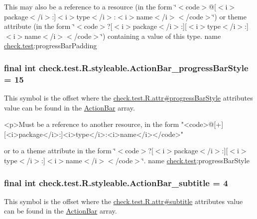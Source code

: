 This may also be a reference to a resource (in the form \char`\"{}$<$code$>$@\mbox{[}$<$i$>$package$<$/i$>$\+:\mbox{]}$<$i$>$type$<$/i$>$\+:$<$i$>$name$<$/i$>$$<$/code$>$\char`\"{}) or theme attribute (in the form \char`\"{}$<$code$>$?\mbox{[}$<$i$>$package$<$/i$>$\+:\mbox{]}\mbox{[}$<$i$>$type$<$/i$>$\+:\mbox{]}$<$i$>$name$<$/i$>$$<$/code$>$\char`\"{}) containing a value of this type.  name \hyperlink{namespacecheck_1_1test}{check.\+test}\+:progress\+Bar\+Padding \hypertarget{classcheck_1_1test_1_1_r_1_1styleable_a3789f8c4018be856bcd214951aadcb71}{}
\subsubsection[{Action\+Bar\+\_\+progress\+Bar\+Style}]{\setlength{\rightskip}{0pt plus 5cm}final int check.\+test.\+R.\+styleable.\+Action\+Bar\+\_\+progress\+Bar\+Style = 15\hspace{0.3cm}{\ttfamily [static]}}\label{classcheck_1_1test_1_1_r_1_1styleable_a3789f8c4018be856bcd214951aadcb71}
This symbol is the offset where the \hyperlink{classcheck_1_1test_1_1_r_1_1attr_afe708c30f6626b84484aba801cab4255}{check.\+test.\+R.\+attr\#progress\+Bar\+Style} attribute\textquotesingle{}s value can be found in the \hyperlink{classcheck_1_1test_1_1_r_1_1styleable_ad0a4d403cb244ea4d22c6f6ebf2c2cdf}{Action\+Bar} array.

\begin{DoxyVerb}      <p>Must be a reference to another resource, in the form "<code>@[+][<i>package</i>:]<i>type</i>:<i>name</i></code>"
\end{DoxyVerb}
 or to a theme attribute in the form \char`\"{}$<$code$>$?\mbox{[}$<$i$>$package$<$/i$>$\+:\mbox{]}\mbox{[}$<$i$>$type$<$/i$>$\+:\mbox{]}$<$i$>$name$<$/i$>$$<$/code$>$\char`\"{}.  name \hyperlink{namespacecheck_1_1test}{check.\+test}\+:progress\+Bar\+Style \hypertarget{classcheck_1_1test_1_1_r_1_1styleable_a84729c20d79b553693df4d068f7a3ceb}{}
\subsubsection[{Action\+Bar\+\_\+subtitle}]{\setlength{\rightskip}{0pt plus 5cm}final int check.\+test.\+R.\+styleable.\+Action\+Bar\+\_\+subtitle = 4\hspace{0.3cm}{\ttfamily [static]}}\label{classcheck_1_1test_1_1_r_1_1styleable_a84729c20d79b553693df4d068f7a3ceb}
This symbol is the offset where the \hyperlink{classcheck_1_1test_1_1_r_1_1attr_aba79cc7bd7219629cd636e1c463aa4af}{check.\+test.\+R.\+attr\#subtitle} attribute\textquotesingle{}s value can be found in the \hyperlink{classcheck_1_1test_1_1_r_1_1styleable_ad0a4d403cb244ea4d22c6f6ebf2c2cdf}{Action\+Bar} array.

